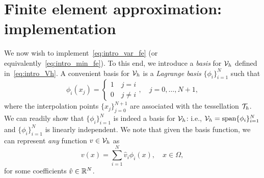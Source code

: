 \section{Finite element approximation: implementation}
We now wish to implement~\eqref{eq:intro_var_fe} (or equivalently~\eqref{eq:intro_min_fe}).  To this end, we introduce a \emph{basis} for $\mathcal{V}_h$ defined in~\eqref{eq:intro_Vh}.  A convenient basis for $\mathcal{V}_h$ is a \emph{Lagrange basis} $\{\phi_i\}_{i=1}^N$ such that 
\begin{equation*}
  \phi_i(x_j) = \begin{cases}
    1 \quad j = i \\
    0 \quad j\neq i
  \end{cases},
  \quad j = 0,\dots,N+1,
\end{equation*}
where the interpolation points $\{ x_j \}_{j=0}^{N+1}$ are associated with the tessellation $\mathcal{T}_h$. We can readily show that $\{ \phi_i \}_{i=1}^N$ is indeed a basis for $\mathcal{V}_h$: i.e., $\mathcal{V}_h = \text{span}\{ \phi_i \}_{i=1}^N$ and $\{\phi_i\}_{i=1}^N$ is linearly independent. We note that given the basis function, we can represent \emph{any} function $v \in \mathcal{V}_h$ as
\begin{equation*}
  v(x) = \sum_{i=1}^N \hat v_i \phi_i(x), \quad x \in \Omega,
\end{equation*}
for some coefficients $\hat v \in \mathbb{R}^N$.


